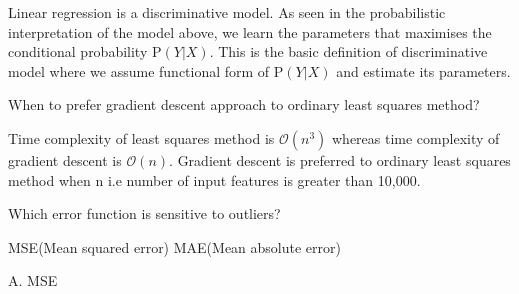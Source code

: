 \documentclass[12pt,letterpaper, onecolumn]{exam}
\begin{document}
\begin{questions}
\begin{Solution}
  Linear regression is a discriminative model. As seen in the probabilistic interpretation of the model above, we learn the parameters that maximises the conditional probability P$(Y|X)$. This is the basic definition of discriminative model where we assume functional form of P$(Y|X)$ and estimate its parameters. 
  \end{Solution}
  \question[] When to prefer gradient descent approach to ordinary least squares method?\\
  \begin{Solution}
  Time complexity of least squares method is $\mathcal{O}(n^3)$ whereas time complexity of gradient descent is $\mathcal{O}(n)$.
  Gradient descent is preferred to ordinary least squares method when n i.e number of input features is greater than 10,000.
  
  \end{Solution}
  \question[] Which error function is sensitive to outliers?
  \begin{choices}
  \choice MSE(Mean squared error)
  \choice MAE(Mean absolute error)
  \end{choices}
  \begin{Solution}
  A. MSE
  \end{Solution}
\end{questions}
\end{document}
